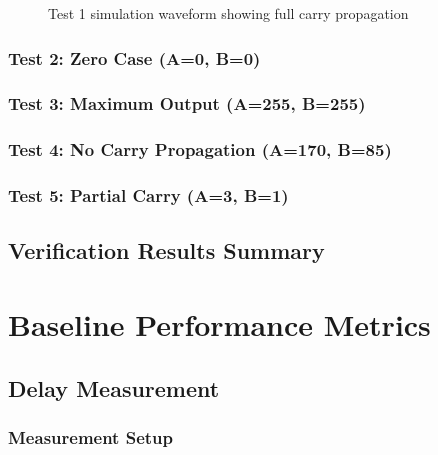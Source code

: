 \documentclass[12pt,letterpaper]{article}
\begin{document}
\begin{figure}[H]
    \centering
    \caption{Test 1 simulation waveform showing full carry propagation}
    \label{fig:test1}
\end{figure}

\subsubsection{Test 2: Zero Case (A=0, B=0)}


\subsubsection{Test 3: Maximum Output (A=255, B=255)}

\subsubsection{Test 4: No Carry Propagation (A=170, B=85)}

\subsubsection{Test 5: Partial Carry (A=3, B=1)}

\subsection{Verification Results Summary}


\section{Baseline Performance Metrics}
\label{sec:baseline_metrics}


\subsection{Delay Measurement}

\subsubsection{Measurement Setup}
\end{document}
